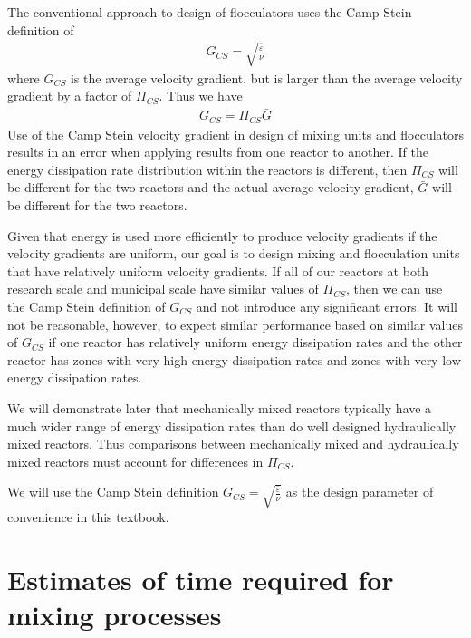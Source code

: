 \documentclass[letterpaper,10pt,english]{sphinxmanual}
\begin{document}
The conventional approach to design of flocculators uses the Camp Stein definition of
\begin{equation}\label{equation:Rapid_Mix/RM_Derivations:Rapid_Mix/RM_Derivations:32}
\begin{split}G_{CS} = \sqrt{\frac{\bar\varepsilon}{\nu}}\end{split}
\end{equation}
where \(G_{CS}\) is  the average velocity gradient, but is larger than the average velocity gradient by a factor of \(\Pi_{CS}\). Thus we have
\begin{equation}\label{equation:Rapid_Mix/RM_Derivations:Rapid_Mix/RM_Derivations:33}
\begin{split}G_{CS} = \Pi_{CS}\bar G\end{split}
\end{equation}
Use of the Camp Stein velocity gradient in design of mixing units and flocculators results in an error when applying results from one reactor to another. If the energy dissipation rate distribution within the reactors is different, then \(\Pi_{CS}\) will be different for the two reactors and the actual average velocity gradient, \(\bar G\) will be different for the two reactors.

Given that energy is used more efficiently to produce velocity gradients if the velocity gradients are uniform, our goal is to design mixing and flocculation units that have relatively uniform velocity gradients. If all of our reactors at both research scale and municipal scale have similar values of \(\Pi_{CS}\), then we can use the Camp Stein definition of \(G_{CS}\) and not introduce any significant errors. It will not be reasonable, however, to expect similar performance based on similar values of \(G_{CS}\) if one reactor has relatively uniform energy dissipation rates and the other reactor has zones with very high energy dissipation rates and zones with very low energy dissipation rates.

We will demonstrate later that mechanically mixed reactors typically have a much wider range of energy dissipation rates than do well designed hydraulically mixed reactors. Thus comparisons between mechanically mixed and hydraulically mixed reactors must account for differences in \(\Pi_{CS}\).

We will use the Camp Stein definition \(G_{CS} = \sqrt{\frac{\bar\varepsilon}{\nu}}\) as the design parameter of convenience in this textbook.


\section{Estimates of time required for mixing processes}
\label{\detokenize{Rapid_Mix/RM_Derivations:estimates-of-time-required-for-mixing-processes}}\label{\detokenize{Rapid_Mix/RM_Derivations:heading-estimates-of-time-required-for-mixing-processes}}
\end{document}
